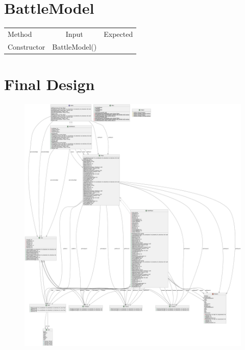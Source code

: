 \documentclass[12pt]{amsart}
\begin{document}
\section{BattleModel}

\begin{table}[htbp]
   \begin{tabular}{@{} lcr @{}} %

      Method      & Input & Expected \\
         Constructor      & BattleModel()    &   \\
    \end{tabular}
\end{table}

\newpage

\section{Final Design}
\begin{figure}[H] %
\centering %
\includegraphics[width=1.2\textwidth,]{uml_final.png} %
\end{figure}
\end{document}
